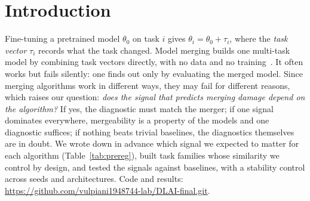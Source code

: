 \documentclass{article}
\makeatletter
\renewcommand{\printAffiliationsAndNotice}[1]{%
  {\let\thefootnote\relax\footnotetext{\hspace*{-\footnotesep}\Notice@String}}}
\makeatother
\begin{document}

\printAffiliationsAndNotice{}

\begin{abstract}
Model merging combines models fine-tuned from a common checkpoint by arithmetic on their weights, but whether a merge works is usually discovered only after performing it. We ask whether the pre-merge signal that best predicts merging damage depends on the merging algorithm. We fine-tune \nFTall{} models on CIFAR-100 task families whose similarity is set by a five-level dial, run \nMergeAll{} merges with weight averaging, task arithmetic, TIES and DARE, and test five signals against trivial baselines. The answer is no: the same similarity signals predict the damage for all four algorithms. CKA is the most reliable diagnostic and the only one that keeps its sign on a ResNet-18 control, where weight-space cosine reverses. We also show that weighted sign conflict is a function of cosine, and that DARE's apparent failure is an untuned scaling.
\end{abstract}

\section{Introduction}\label{sec:intro}

Fine-tuning a pretrained model $\theta_0$ on task $i$ gives $\theta_i = \theta_0 + \tau_i$, where the \emph{task vector} $\tau_i$ records what the task changed. Model merging builds one multi-task model by combining task vectors directly, with no data and no training~\cite{wortsman2022soups,ilharco2023editing}. It often works but fails silently: one finds out only by evaluating the merged model. Since merging algorithms work in different ways, they may fail for different reasons, which raises our question: \emph{does the signal that predicts merging damage depend on the algorithm?} If yes, the diagnostic must match the merger; if one signal dominates everywhere, mergeability is a property of the models and one diagnostic suffices; if nothing beats trivial baselines, the diagnostics themselves are in doubt. We wrote down in advance which signal we expected to matter for each algorithm (Table~\ref{tab:prereg}), built task families whose similarity we control by design, and tested the signals against baselines, with a stability control across seeds and architectures. Code and results: \url{https://github.com/vulpiani1948744-lab/DLAI-final.git}.
\end{document}
